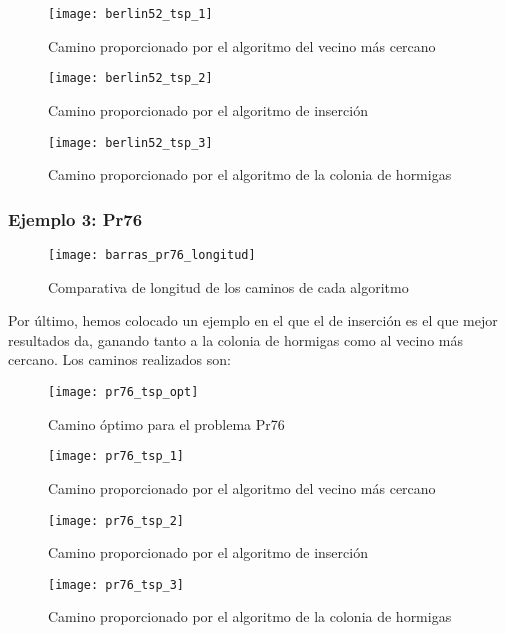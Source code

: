 \begin{figure}	\texttt{[image: berlin52\_tsp\_1]} \centering
	\caption{Camino proporcionado por el algoritmo del vecino más cercano} \end{figure}

\begin{figure}	\texttt{[image: berlin52\_tsp\_2]} \centering
	\caption{Camino proporcionado por el algoritmo de inserción} \end{figure}

\begin{figure}	\texttt{[image: berlin52\_tsp\_3]} \centering
	\caption{Camino proporcionado por el algoritmo de la colonia de hormigas} \end{figure}

\clearpage
\subsubsection{Ejemplo 3: Pr76}

\begin{figure}[h]	\texttt{[image: barras\_pr76\_longitud]} \centering
	\caption{Comparativa de longitud de los caminos de cada algoritmo} \end{figure}

Por último, hemos colocado un ejemplo en el que el de inserción es el que mejor resultados da, ganando tanto a la colonia de hormigas como al vecino más cercano. Los caminos realizados son:

\begin{figure}	\texttt{[image: pr76\_tsp\_opt]} \centering
	\caption{Camino óptimo para el problema Pr76} \end{figure}

\begin{figure}	\texttt{[image: pr76\_tsp\_1]} \centering
	\caption{Camino proporcionado por el algoritmo del vecino más cercano} \end{figure}

\begin{figure}	\texttt{[image: pr76\_tsp\_2]} \centering
	\caption{Camino proporcionado por el algoritmo de inserción} \end{figure}

\begin{figure}	\texttt{[image: pr76\_tsp\_3]} \centering
	\caption{Camino proporcionado por el algoritmo de la colonia de hormigas} \end{figure}
